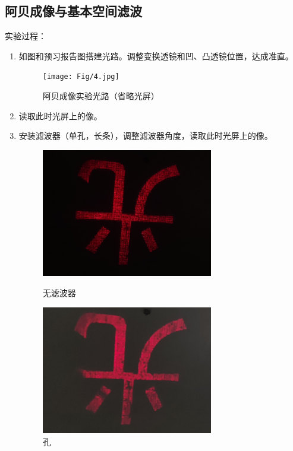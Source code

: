 \documentclass[11pt]{article}
\begin{document}
\subsection{阿贝成像与基本空间滤波}
\noindent 实验过程：
\begin{enumerate}
    \item 如图和预习报告图搭建光路。调整变换透镜和凹、凸透镜位置，达成准直。
    \begin{figure}[H]
        \centering
        \texttt{[image: Fig/4.jpg]}
        \caption{阿贝成像实验光路（省略光屏）}
    \end{figure} 
    \item 读取此时光屏上的像。
    \item 安装滤波器（单孔，长条），调整滤波器角度，读取此时光屏上的像。
    \begin{figure}[H]
        \centering
        \begin{minipage}[t]{0.49\linewidth}
            \centering
            \includegraphics[width=7.5cm]{Fig/5-无滤波器.jpg}
            \caption{无滤波器}
        \end{minipage}
        \begin{minipage}[t]{0.49\linewidth}
            \centering
            \includegraphics[width=7.5cm]{Fig/5-孔}
            \caption{孔}
        \end{minipage} 
        

\end{figure}
\end{enumerate}
\end{document}

